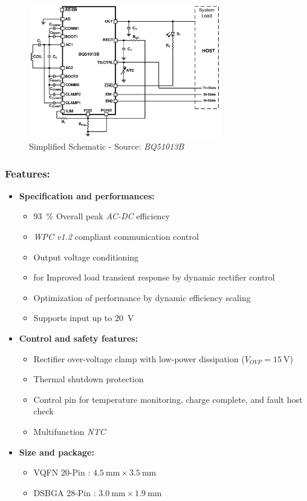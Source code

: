 \documentclass[report.tex]{subfiles}
\begin{document}
\begin{figure}[H]
	\centering
	\includegraphics[width=0.75\textwidth]{Include/Figure/comp/bq51013b_simpl_schem.png}
	\caption{Simplified Schematic - Source: \textit{BQ51013B}\cite{BQ51013B}}
	\label{fig:bq51013b_simpl_schem}
\end{figure}

\subsubsection{Features:}

\begin{itemize}
\item \textbf{Specification and performances:}
\begin{itemize}
\item \SI{93}{\percent} Overall peak \textit{AC-DC} efficiency
\item \textit{WPC v1.2} compliant communication control
\item Output voltage conditioning
\item for Improved load transient response by dynamic rectifier control
\item Optimization of performance by dynamic efficiency scaling
\item Supports input up to \SI{20}{\volt}
\end{itemize}
\item \textbf{Control and safety features:}
\begin{itemize}
\item Rectifier over-voltage clamp with low-power dissipation ($V_{OVP} = \SI{15}{\volt}$)
\item Thermal shutdown protection
\item Control pin for temperature monitoring, charge complete, and fault host check 
\item Multifunction \textit{NTC} 
\end{itemize}
\item \textbf{Size and package:}
\begin{itemize}
\item VQFN 20-Pin : $\SI{4.5}{\milli\meter} \times \SI{3.5}{\milli\meter}$
\item DSBGA 28-Pin : $\SI{3.0}{\milli\meter} \times \SI{1.9}{\milli\meter}$
\end{itemize}
\end{itemize}
\end{document}
